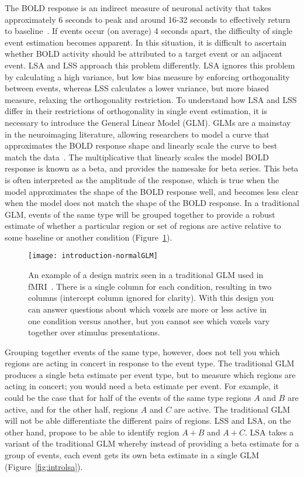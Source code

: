 \documentclass[phd,appendix,figures]{uithesis}
\begin{document}
The BOLD response is an indirect measure of neuronal activity that takes approximately 6 seconds to
peak and around 16-32 seconds to effectively return to baseline~\cite{Glover1999}.
If events occur (on average) 4 seconds apart, the difficulty of single event estimation
becomes apparent.
In this situation, it is difficult to ascertain whether BOLD activity should be attributed to a target event or an
adjacent event.
LSA and LSS approach this problem differently.
LSA ignores this problem by calculating a high variance, but low bias measure by enforcing orthogonality
between events,
whereas LSS calculates a lower variance, but more biased measure, relaxing the orthogonality restriction.
To understand how LSA and LSS differ in their restrictions of orthogonality in single event estimation,
it is necessary to introduce the General Linear Model (GLM).
GLMs are a mainstay in the neuroimaging literature, allowing researchers to model
a curve that approximates the BOLD response shape and linearly scale the curve
to best match the data~\cite{Friston1995a}.
The multiplicative that linearly scales the model BOLD response is known as a beta,
and provides the namesake for beta series.
This beta is often interpreted as the amplitude of the response, which is true when the
model approximates the shape of the BOLD response well, and becomes less clear when
the model does not match the shape of the BOLD response.
In a traditional GLM, events of the same type will be grouped together
to provide a robust estimate of whether a particular region or set of regions are
active relative to some baseline or another condition (Figure~\ref{fig:introGLM}).

\begin{figure}[H]
  \centering
  \texttt{[image: introduction-normalGLM]}
  \caption[Example GLM design matrix]{
    An example of a design matrix seen in a traditional GLM used in fMRI~\cite{Friston1995a}.
    There is a single column for each condition, resulting in two columns (intercept column ignored for clarity).
    With this design you can answer questions about which voxels are more or less active in one condition
    versus another, but you cannot see which voxels vary together over stimulus presentations.
  }
  \label{fig:introGLM}
\end{figure}

Grouping together events of the same type, however, does not tell you which regions are acting in concert
in response to the event type.
The traditional GLM produces a single beta estimate per event type, but to measure which regions
are acting in concert; you would need a beta estimate per event.
For example, it could be the case that for half of the events of the same type regions $A$ and $B$ are active,
and for the other half, regions $A$ and $C$ are active.
The traditional GLM will not be able differentiate the different pairs of regions.
LSS and LSA, on the other hand, propose to be able to identify region $A+B$ and $A+C$.
LSA takes a variant of the traditional GLM whereby instead of providing a beta
estimate for a group of events, each event gets its own beta estimate in a single GLM (Figure~\ref{fig:introlsa}).
\end{document}
